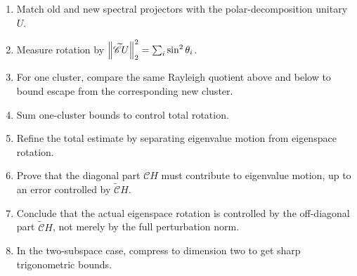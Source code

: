 \documentclass[11pt]{article}
\newcommand{\Pinch}{\mathscr{C}}
\newcommand{\Off}{\widetilde{\mathscr{C}}}
\newcommand{\Pinch}{\mathcal{D}}
\newcommand{\Off}{\mathcal{D}^{\perp}}
\theoremstyle{definition}
\begin{document}
\begin{enumerate}
  \item Match old and new spectral projectors with the polar-decomposition
  unitary \(U\).
  \item Measure rotation by \(\norm[2]{\Off U}^2=\sum_i\sin^2\theta_i\).
  \item For one cluster, compare the same Rayleigh quotient above and below to
  bound escape from the corresponding new cluster.
  \item Sum one-cluster bounds to control total rotation.
  \item Refine the total estimate by separating eigenvalue motion from
  eigenspace rotation.
  \item Prove that the diagonal part \(\Pinch H\) must contribute to eigenvalue
  motion, up to an error controlled by \(\Off H\).
  \item Conclude that the actual eigenspace rotation is controlled by the
  off-diagonal part \(\Off H\), not merely by the full perturbation norm.
  \item In the two-subspace case, compress to dimension two to get sharp
  trigonometric bounds.
\end{enumerate}
\end{document}

